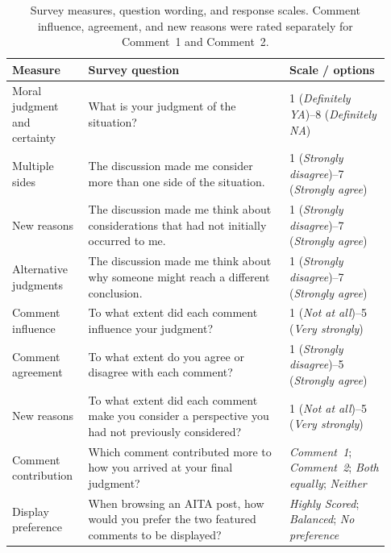 \begin{table}[H]
  \centering
  \small
  \setlength{\tabcolsep}{3pt}
  \renewcommand{\arraystretch}{1.08}
  \begin{tabular}{@{}
    p{0.18\linewidth}
    p{0.50\linewidth}
    p{0.25\linewidth}@{}}
    \toprule
    Measure & Survey question & Scale / options \\
    \midrule

    Moral judgment and certainty
    & What is your judgment of the situation?
    & 1 (\textit{Definitely YA})--8 (\textit{Definitely NA}) \\

    \addlinespace[2pt]

    Multiple sides
    & The discussion made me consider more than one side of the situation.
    & 1 (\textit{Strongly disagree})--7
    (\textit{Strongly agree}) \\

    New reasons
    & The discussion made me think about considerations that had not
    initially occurred to me.
    & 1 (\textit{Strongly disagree})--7
    (\textit{Strongly agree}) \\

    Alternative judgments
    & The discussion made me think about why someone might reach a
    different conclusion.
    & 1 (\textit{Strongly disagree})--7
    (\textit{Strongly agree}) \\

    \addlinespace[2pt]

    Comment influence
    & To what extent did each comment influence your judgment?
    & 1 (\textit{Not at all})--5
    (\textit{Very strongly}) \\

    Comment agreement
    & To what extent do you agree or disagree with each comment?
    & 1 (\textit{Strongly disagree})--5
    (\textit{Strongly agree}) \\

    New reasons
    & To what extent did each comment make you consider a perspective
    you had not previously considered?
    & 1 (\textit{Not at all})--5
    (\textit{Very strongly}) \\

    Comment contribution
    & Which comment contributed more to how you arrived at your final
    judgment?
    & \textit{Comment~1}; \textit{Comment~2};
    \textit{Both equally}; \textit{Neither} \\

    Display preference
    & When browsing an AITA post, how would you prefer the two featured
    comments to be displayed?
    & \textit{Highly Scored}; \textit{Balanced};
    \textit{No preference} \\

    \bottomrule
  \end{tabular}

  \caption{Survey measures, question wording, and response scales.
  Comment influence, agreement, and new reasons were rated separately
  for Comment~1 and Comment~2.}
  \label{tab:survey-questions}
\end{table}